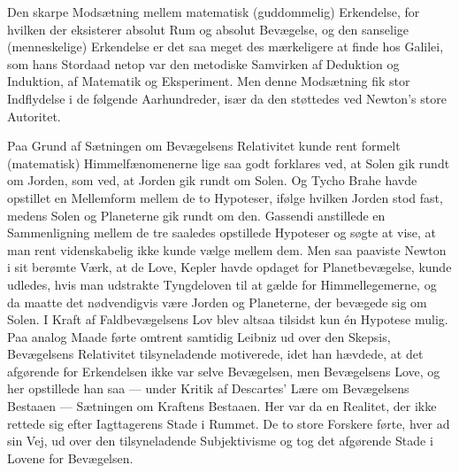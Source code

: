 \documentclass[12pt]{article}
\newcommand{\opage}[1]{\marginnote{\footnotesize\textit{[#1]}}}
\begin{document}
Den skarpe Modsætning mellem matematisk (guddommelig) Erkendelse, for hvilken
der eksisterer absolut Rum og absolut Bevægelse, og den sanselige
(menneskelige) Erkendelse er det saa meget des mærkeligere at finde hos
Galilei, som hans Stordaad netop var den metodiske Samvirken af Deduktion og
Induktion, af Matematik og Eksperiment. Men denne Modsætning fik stor
Indflydelse i de følgende Aarhundreder, især da den støttedes ved Newton's
store Autoritet.

Paa Grund af Sætningen om Bevægelsens Relativitet kunde rent formelt
(matematisk) Himmelfænomenerne lige%
\opage{66}saa godt forklares ved, at Solen gik rundt om Jorden, som ved, at Jorden gik
rundt om Solen. Og Tycho Brahe havde opstillet en Mellemform mellem de to
Hypoteser, ifølge hvilken Jorden stod fast, medens Solen og Planeterne gik
rundt om den. Gassendi anstillede en Sammenligning mellem de tre saaledes
opstillede Hypoteser og søgte at vise, at man rent videnskabelig ikke kunde
vælge mellem dem. Men saa paaviste Newton i sit berømte Værk, at de Love,
Kepler havde opdaget for Planetbevægelse, kunde udledes, hvis man udstrakte
Tyngdeloven til at gælde for Himmellegemerne, og da maatte det nødvendigvis
være Jorden og Planeterne, der bevægede sig om Solen. I Kraft af
Faldbevægelsens Lov blev altsaa tilsidst kun én Hypotese mulig. Paa analog
Maade førte omtrent samtidig Leibniz ud over den Skepsis, Bevægelsens
Relativitet tilsyneladende motiverede, idet han hævdede, at det afgørende for
Erkendelsen ikke var selve Bevægelsen, men Bevægelsens Love, og her opstillede
han saa --- under Kritik af Descartes' Lære om Bevægelsens Bestaaen ---
Sætningen om Kraftens Bestaaen. Her var da en Realitet, der ikke rettede sig
efter Iagttagerens Stade i Rummet. De to store Forskere førte, hver ad sin
Vej, ud over den tilsyneladende Subjektivisme og tog det afgørende Stade i
Lovene for Bevægelsen.
\end{document}
